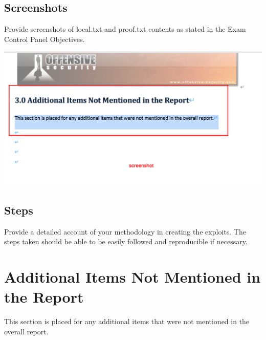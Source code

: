 \documentclass[a4paper]{article}
\begin{document}
\subsection{Screenshots}
Provide screenshots of local.txt and proof.txt contents as stated in the Exam Control Panel Objectives.

\includegraphics[]{screenshot.png}

\subsection{Steps}
Provide a detailed account of your methodology in creating the exploits. The steps taken should be able to be easily followed and reproducible if necessary.

\section{Additional Items Not Mentioned in the Report}
This section is placed for any additional items that were not mentioned in the overall report.
\end{document}
